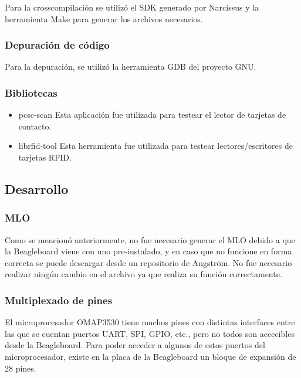 \documentclass[%
        final,
        notitlepage,
        narroweqnarray,
        inline,
        ]{ieee}
\begin{document}
Para la crosscompilación se utilizó el SDK generado por Narcissus y la herramienta Make para generar los archivos necesarios.

\subsubsection{Depuración de código}
Para la depuración, se utilizó la herramienta GDB del proyecto GNU. 


\subsubsection{Bibliotecas}

\begin{itemize}
\item pcsc-scan 
Esta aplicación fue utilizada para testear el lector de tarjetas de contacto.
\item  librfid-tool 
Esta herramienta fue utilizada para testear lectores/escritores de tarjetas RFID.
\end{itemize}


\subsection{Desarrollo}

\subsubsection{MLO}
Como se mencionó anteriormente, no fue necesario generar el MLO debido a que la Beagleboard viene con uno pre-instalado, y en caso que no funcione en forma correcta se puede descargar desde un repositorio de Angström. No fue necesario realizar ningún cambio en el archivo ya que realiza su función correctamente.

\subsubsection{Multiplexado de pines}
El microprocesador OMAP3530 tiene muchos pines con distintas interfaces entre las
que se cuentan puertos UART, SPI, GPIO, etc., pero no todos son accecibles desde la Beagleboard. 
Para poder acceder a algunos de estos puertos del microprocesador, existe en la placa de la
Beagleboard un bloque de expansión de 28 pines.
\end{document}
